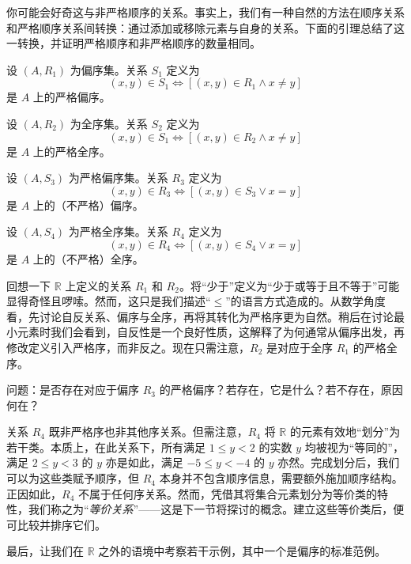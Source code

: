 你可能会好奇这与非严格顺序的关系。事实上，我们有一种自然的方法在顺序关系和严格顺序关系间转换：通过添加或移除元素与自身的关系。下面的引理总结了这一转换，并证明严格顺序和非严格顺序的数量相同。

\begin{lemma}
    设 $(A, R_1)$ 为偏序集。关系 $S_1$ 定义为
    \[(x, y) \in S_1 \iff [(x, y) \in R_1 \land x \ne y]\]
    是 $A$ 上的严格偏序。
\end{lemma}
\begin{lemma}
    设 $(A, R_2)$ 为全序集。关系 $S_2$ 定义为
    \[(x, y) \in S_1 \iff [(x, y) \in R_2 \land x \ne y]\]
    是 $A$ 上的严格全序。
\end{lemma}
\begin{lemma}
    设 $(A, S_3)$ 为严格偏序集。关系 $R_3$ 定义为
    \[(x, y) \in R_3 \iff [(x, y) \in S_3 \lor x = y]\]
    是 $A$ 上的（不严格）偏序。
\end{lemma}
\begin{lemma}
    设 $(A, S_4)$ 为严格全序集。关系 $R_4$ 定义为
    \[(x, y) \in R_4 \iff [(x, y) \in S_4 \lor x = y]\]
    是 $A$ 上的（不严格）全序。
\end{lemma}

回想一下 $\mathbb{R}$ 上定义的关系 $R_1$ 和 $R_2$。将``少于''定义为``少于或等于且不等于''可能显得奇怪且啰嗦。然而，这只是我们描述``$\le$''的语言方式造成的。从数学角度看，先讨论自反关系、偏序与全序，再将其转化为严格序更为自然。稍后在讨论最小元素时我们会看到，自反性是一个良好性质，这解释了为何通常从偏序出发，再修改定义引入严格序，而非反之。现在只需注意，$R_2$ 是对应于全序 $R_1$ 的严格全序。

问题：是否存在对应于偏序 $R_3$ 的严格偏序？若存在，它是什么？若不存在，原因何在？

关系 $R_4$ 既非严格序也非其他序关系。但需注意，$R_4$ 将 $\mathbb{R}$ 的元素有效地``划分''为若干类。本质上，在此关系下，所有满足 $1 \le y < 2$ 的实数 $y$ 均被视为``等同的''，满足 $2 \le y < 3$ 的 $y$ 亦是如此，满足 $-5 \le y < -4$ 的 $y$ 亦然。完成划分后，我们可以为这些类赋予顺序，但 $R_4$ 本身并不包含顺序信息，需要额外施加顺序结构。正因如此，$R_4$ 不属于任何序关系。然而，凭借其将集合元素划分为等价类的特性，我们称之为``\emph{等价关系}''——这是下一节将探讨的概念。建立这些等价类后，便可比较并排序它们。

最后，让我们在 $\mathbb{R}$ 之外的语境中考察若干示例，其中一个是偏序的标准范例。

